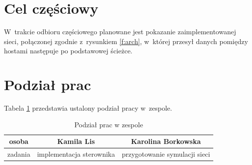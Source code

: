 \documentclass{article}
\begin{document}
	\section{Cel częściowy}
	W~trakcie odbioru częściowego planowane jest pokazanie zaimplementowanej sieci, połączonej zgodnie z~rysunkiem \ref{f:arch}, w~której przesył danych pomiędzy hostami następuje po podstawowej ścieżce. 
	\section{Podział prac}
	Tabela \ref{t:podzial_prac} przedstawia ustalony podział pracy w~zespole.
	\begin{table}[h]
		\centering
		\begin{tabular}{|c|c|c|}
			\hline
			osoba& Kamila Lis & Karolina Borkowska\\
			\hline
			zadania & implementacja sterownika& przygotowanie symulacji sieci\\
			\hline
		\end{tabular}	
		\caption{Podział prac w zespole}
		\label{t:podzial_prac}
	\end{table}
	
	

	
\end{document}
